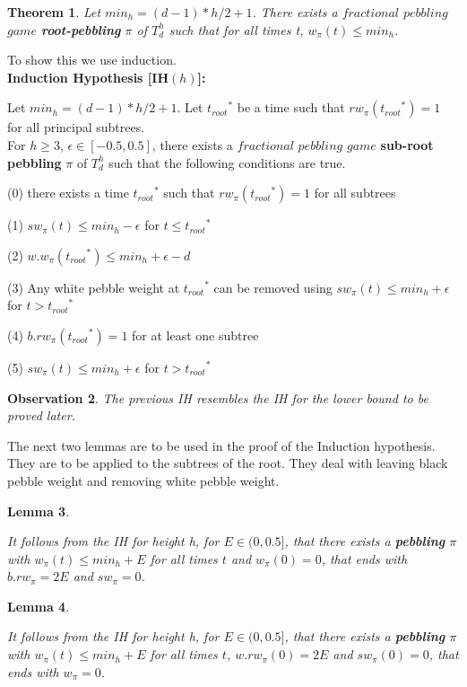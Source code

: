 \documentclass[12pt]{article}
\newtheorem{theorem}{Theorem}[subsection]
\newtheorem{lemma}[theorem]{Lemma}
\newtheorem{obs}[theorem]{Observation}
\newcommand{\troots}{{t_{root}}^*}
\begin{document}
\begin{theorem}
Let $min_h = (d-1) * h/2+1$.
There exists a $fractional $ $pebbling$ $game$ {\bf root-pebbling} $\pi$ of $T^h_d$ such
that for all times t, $w_\pi(t) \le min_h$.
\end{theorem}

\noindent
To show this we use induction.\\


\noindent
{\bf Induction Hypothesis [IH$(h)$]:} 


\noindent
Let $min_h = (d-1) * h/2+1$. Let $\troots$ be a time such that $rw_\pi(\troots)=1$ for all principal subtrees. \\
For $h\geq 3$, $\epsilon \in [-0.5,0.5]$, there exists a $fractional$ $pebbling$ $game$ {\bf sub-root pebbling} $\pi$ of $T_d^h$ such that the following conditions are true. 

(0) there exists a time $\troots$ such that $rw_\pi(\troots)=1$ for all subtrees

(1) $sw_\pi(t) \leq min_h-\epsilon$ for $t \leq \troots$

(2) $w.w_\pi(\troots) \leq min_h+\epsilon - d$

(3) Any white pebble weight at $\troots$ can be removed using $sw_\pi(t) \leq min_h+\epsilon$ for  $t > \troots$ 

(4) $b.rw_\pi(\troots)=1$ for at least one subtree

(5) $sw_\pi(t) \leq min_h+\epsilon$ for  $t > \troots$\\


\begin{obs} 
The previous IH resembles the IH for the lower bound to be proved later.
\end{obs}


The next two lemmas are to be used in the proof of the Induction hypothesis. They are to be applied to the subtrees of the root. They deal with leaving black pebble weight and removing white pebble weight.

\begin{lemma} \label{fup1}

It follows from the IH for height h, for $E \in (0,0.5]$, that there exists a {\bf pebbling} $\pi$ with $w_\pi(t) \leq min_h+E$ for all times $t$ and $w_\pi(0)=0$, that ends with $b.rw_{\pi} = 2E$ and $sw_\pi=0$.
\end{lemma}


\begin{lemma} \label{fup2}

It follows from the IH for height h, for $E \in (0,0.5]$, that there exists a {\bf pebbling} $\pi$ with $w_\pi(t) \leq min_h+E$ for all times $t$,  $w.rw_{\pi}(0) = 2E$  and $sw_\pi(0)=0$, that ends with $w_\pi=0$.
\end{lemma}
\end{document}
